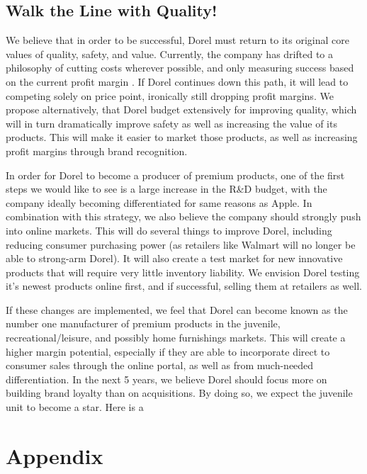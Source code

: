 {\section{Walk the Line with Quality!}
We believe that in order to be successful, Dorel must return to its original core values of quality, safety, and value.  Currently, the company has drifted to a philosophy of cutting costs wherever possible, and only measuring success based on the current profit margin \cite{BRAINStaff2012}.  If Dorel continues down this path, it will lead to competing solely on price point, ironically still dropping profit margins.  We propose alternatively, that Dorel budget extensively for improving quality, which will in turn dramatically improve safety as well as increasing the value of its products.  This will make it easier to market those products, as well as increasing profit margins through brand recognition. 

In order for Dorel to become a producer of premium products, one of the first steps we would like to see is a large increase in the R\&D budget, with the company ideally becoming differentiated for same reasons as Apple.  In combination with this strategy, we also believe the company should strongly push into online markets.  This will do several things to improve Dorel, including reducing consumer purchasing power (as retailers like Walmart will no longer be able to strong-arm Dorel).  It will also create a test market for new innovative products that will require very little inventory liability.  We envision Dorel testing it's newest products online first, and if successful, selling them at retailers as well.  

If these changes are implemented, we feel that Dorel can become known as the number one manufacturer of premium products in the juvenile, recreational/leisure, and possibly home furnishings markets.  This will create a higher margin potential, especially if they are able to incorporate direct to consumer sales through the online portal, as well as from much-needed differentiation.  In the next 5 years, we believe Dorel should focus more on building brand loyalty than on acquisitions.  By doing so, we expect the juvenile unit to become a star.  Here is a 





\chapter{Appendix}

}
